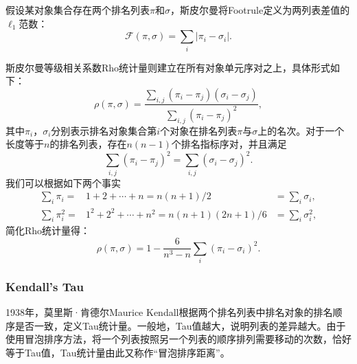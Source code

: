 假设某对象集合存在两个排名列表$\pi$和$\sigma$，斯皮尔曼将Footrule定义为两列表差值的$\ell_1$范数：
\begin{equation}\label{eq:spearmanfootrule}
    \mathcal F(\pi,\sigma) = \sum\limits_i |\pi_i - \sigma_i|.
\end{equation}

斯皮尔曼等级相关系数Rho统计量则建立在所有对象单元序对之上，具体形式如下：
\begin{equation}
    \rho(\pi,\sigma) = \frac{\sum\limits_{i,j} (\pi_i - \pi_j)(\sigma_i - \sigma_j)}{\sum\limits_{i,j} (\pi_i - \pi_j)^2},
\end{equation}
其中$\pi_i$，$\sigma_i$分别表示排名对象集合第$i$个对象在排名列表$\pi$与$\sigma$上的名次。对于一个长度等于$n$的排名列表，存在$n(n-1)$个排名指标序对，并且满足
\[
    \sum\limits_{i,j} (\pi_i - \pi_j)^2 = \sum\limits_{i,j} (\sigma_i - \sigma_j)^2.
\]
我们可以根据如下两个事实
\begin{eqnarray}
  \sum\limits_i \pi_i = &1 + 2 + \cdots + n = n(n+1)/2 &= \sum\limits_i \sigma_i,\\
  \sum\limits_i \pi_i^2 = & 1^2 + 2^2 + \cdots + n^2 = n(n+1)(2n+1)/6 &=\sum\limits_i \sigma_i^2,
\end{eqnarray}
简化Rho统计量得：
\begin{equation}\label{eq:spearmanrho}
    \rho(\pi,\sigma) = 1 - \frac{6}{n^3-n} \sum\limits_i (\pi_i - \sigma_i)^2.
\end{equation}

\subsubsection{Kendall's Tau}
1938年，莫里斯·肯德尔Maurice Kendall\cite{kendall1938new}根据两个排名列表中排名对象的排名顺序是否一致，定义Tau统计量。一般地，Tau值越大，说明列表的差异越大。由于使用冒泡排序方法，将一个列表按照另一个列表的顺序排列需要移动的次数，恰好等于Tau值，Tau统计量由此又称作“冒泡排序距离”。


